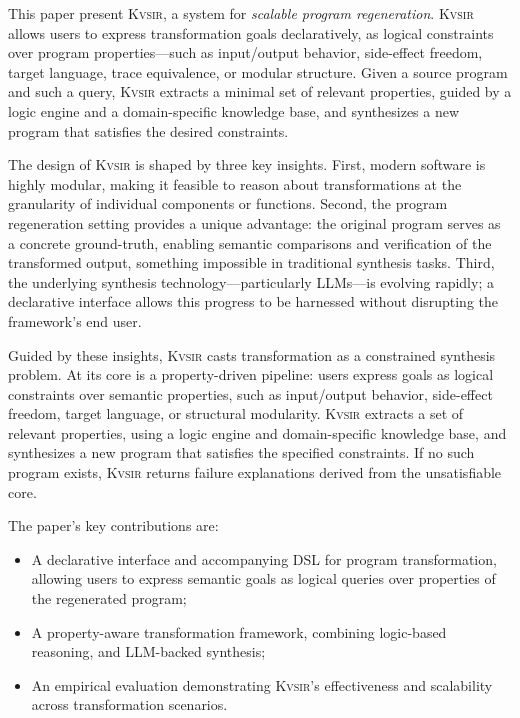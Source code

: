 \documentclass[sigplan]{acmart}
\newcommand{\sys}{{\scshape Kv{\textalpha}sir}\xspace}
\begin{document}
This paper present \sys, a system for \emph{scalable program regeneration}.
\sys allows users
to express transformation goals declaratively, as logical constraints over
program properties---such as input/output behavior, side-effect freedom, target
language, trace equivalence, or modular structure.
Given a source program and
such a query, \sys extracts a minimal set of relevant properties, guided by a
logic engine and a domain-specific knowledge base, and synthesizes a new
program that satisfies the desired constraints.

The design of \sys is shaped by three key insights.
First, modern software is highly modular, making it feasible to reason about transformations at the granularity of individual components or functions.
Second, the program regeneration setting provides a unique advantage: the original program serves as a concrete ground-truth, enabling semantic comparisons and verification of the transformed output, something impossible in traditional synthesis tasks.
Third, the underlying synthesis technology---particularly LLMs---is evolving rapidly; a declarative interface allows this progress to be harnessed without disrupting the framework's end user.

Guided by these insights, \sys casts transformation as a constrained synthesis problem.
At its core is a property-driven pipeline: users express goals as logical constraints over semantic properties, such as input/output behavior, side-effect freedom, target language, or structural modularity.
\sys extracts a set of relevant properties, using a logic engine and domain-specific knowledge base, and synthesizes a new program that satisfies the specified constraints.
If no such program exists, \sys returns failure explanations derived from the unsatisfiable core.


The paper's key contributions are:
\begin{itemize}
 \item A declarative interface and accompanying DSL for program transformation, allowing users to express semantic goals as logical queries over properties of the regenerated program;
 \item A property-aware transformation framework, combining logic-based reasoning, and LLM-backed synthesis;
 \item An empirical evaluation demonstrating \sys’s effectiveness and scalability across transformation scenarios.
\end{itemize}
\end{document}
